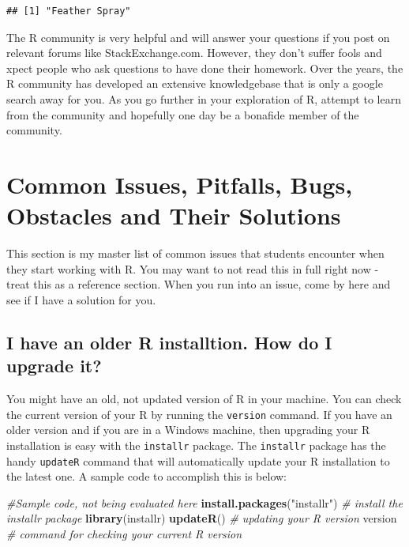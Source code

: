 \documentclass[]{krantz}
\makeatletter
\newenvironment{Shaded}{\begin{snugshade}}{\end{snugshade}}
\newcommand{\KeywordTok}[1]{\textcolor[rgb]{0.27,0.27,0.27}{\textbf{#1}}}
\newcommand{\StringTok}[1]{\textcolor[rgb]{0.5,0.5,0.5}{#1}}
\newcommand{\CommentTok}[1]{\textcolor[rgb]{0.37,0.37,0.37}{\textit{#1}}}
\newcommand{\OperatorTok}[1]{\textcolor[rgb]{0.43,0.43,0.43}{\textbf{#1}}}
\newcommand{\NormalTok}[1]{#1}
\newenvironment{kframe}{%
\medskip{}
\setlength{\fboxsep}{.8em}
 \def\at@end@of@kframe{}%
 \ifinner\ifhmode%
  \def\at@end@of@kframe{\end{minipage}}%
  \begin{minipage}{\columnwidth}%
 \fi\fi%
 \def\FrameCommand##1{\hskip\@totalleftmargin \hskip-\fboxsep
 \colorbox{shadecolor}{##1}\hskip-\fboxsep
     \hskip-\linewidth \hskip-\@totalleftmargin \hskip\columnwidth}%
 \MakeFramed {\advance\hsize-\width
   \@totalleftmargin\z@ \linewidth\hsize
   \@setminipage}}%
 {\par\unskip\endMakeFramed%
 \at@end@of@kframe}
\renewenvironment{Shaded}{\begin{kframe}}{\end{kframe}}
\makeatother
\begin{document}
\begin{Shaded}
\end{Shaded}

\begin{verbatim}
## [1] "Feather Spray"
\end{verbatim}

The R community is very helpful and will answer your questions if you
post on relevant forums like StackExchange.com. However, they don't
suffer fools and xpect people who ask questions to have done their
homework. Over the years, the R community has developed an extensive
knowledgebase that is only a google search away for you. As you go
further in your exploration of R, attempt to learn from the community
and hopefully one day be a bonafide member of the community.

\section{Common Issues, Pitfalls, Bugs, Obstacles and Their
Solutions}\label{common-issues-pitfalls-bugs-obstacles-and-their-solutions}

This section is my master list of common issues that students encounter
when they start working with R. You may want to not read this in full
right now - treat this as a reference section. When you run into an
issue, come by here and see if I have a solution for you.

\subsection{I have an older R installtion. How do I upgrade
it?}\label{i-have-an-older-r-installtion.-how-do-i-upgrade-it}

You might have an old, not updated version of R in your machine. You can
check the current version of your R by running the \texttt{version}
command. If you have an older version and if you are in a Windows
machine, then upgrading your R installation is easy with the
\texttt{installr} package. The \texttt{installr} package has the handy
\texttt{updateR} command that will automatically update your R
installation to the latest one. A sample code to accomplish this is
below:

\begin{Shaded}
\begin{Highlighting}[]
\CommentTok{#Sample code, not being evaluated here}
\KeywordTok{install.packages}\NormalTok{(}\StringTok{"installr"}\NormalTok{) }\CommentTok{# install the installr package }
\KeywordTok{library}\NormalTok{(installr)}
\KeywordTok{updateR}\NormalTok{() }\CommentTok{# updating your R version}
\NormalTok{version }\CommentTok{# command for checking your current R version}
\end{Highlighting}
\end{Shaded}
\end{document}
